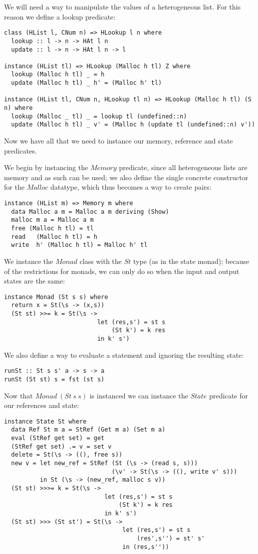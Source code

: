 We will need a way to manipulate the values of a heterogeneous list. For this reason we define a lookup predicate:
\begin{lstlisting}
class (HList l, CNum n) => HLookup l n where
  lookup :: l -> n -> HAt l n
  update :: l -> n -> HAt l n -> l

instance (HList tl) => HLookup (Malloc h tl) Z where
  lookup (Malloc h tl) _ = h
  update (Malloc h tl) _ h' = (Malloc h' tl)

instance (HList tl, CNum n, HLookup tl n) => HLookup (Malloc h tl) (S n) where
  lookup (Malloc _ tl) _ = lookup tl (undefined::n)
  update (Malloc h tl) _ v' = (Malloc h (update tl (undefined::n) v'))
\end{lstlisting}

Now we have all that we need to instance our memory, reference and state predicates.

We begin by instancing the $Memory$ predicate, since all heterogeneous lists are memory and as such can be used; we 
also define the single concrete constructor for the $Malloc$ datatype, which thus becomes a way to create pairs:
\begin{lstlisting}
instance (HList m) => Memory m where
  data Malloc a m = Malloc a m deriving (Show)
  malloc m a = Malloc a m
  free (Malloc h tl) = tl
  read   (Malloc h tl) = h
  write  h' (Malloc h tl) = Malloc h' tl
\end{lstlisting}

We instance the $Monad$ class with the $St$ type (as in the state monad); because of the restrictions for monads, we can only do so when the input and output states are the same:
\begin{lstlisting}
instance Monad (St s s) where
  return x = St(\s -> (x,s))
  (St st) >>= k = St(\s -> 
                          let (res,s') = st s 
                              (St k') = k res
                          in k' s')
\end{lstlisting}

We also define a way to evaluate a statement and ignoring the resulting state:
\begin{lstlisting}
runSt :: St s s' a -> s -> a
runSt (St st) s = fst (st s)
\end{lstlisting}

Now that $Monad\ (St\ s\ s)$ is instanced we can instance the $State$ predicate for our references and state:
\begin{lstlisting}
instance State St where
  data Ref St m a = StRef (Get m a) (Set m a)
  eval (StRef get set) = get
  (StRef get set) .= v = set v
  delete = St(\s -> ((), free s))
  new v = let new_ref = StRef (St (\s -> (read s, s)))
                              (\v' -> St(\s -> ((), write v' s)))
          in St (\s -> (new_ref, malloc s v))
  (St st) >>>= k = St(\s -> 
                            let (res,s') = st s 
                                (St k') = k res
                            in k' s')
  (St st) >>> (St st') = St(\s -> 
                                 let (res,s') = st s 
                                     (res',s'') = st' s'
                                 in (res,s''))
\end{lstlisting}

